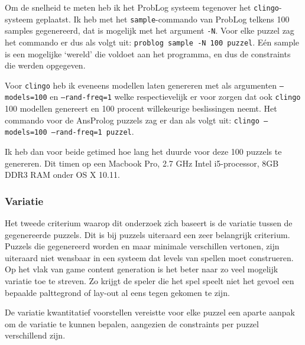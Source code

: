 \documentclass{article}
\begin{document}
Om de snelheid te meten heb ik het ProbLog systeem tegenover het \texttt{clingo}-systeem geplaatst. Ik heb met het \texttt{sample}-commando van ProbLog telkens 100 samples gegenereerd, dat is mogelijk met het argument \texttt{-N}. Voor elke puzzel zag het commando er dus als volgt uit: \texttt{problog sample -N 100 puzzel}. E\'en sample is een mogelijke `wereld' die voldoet aan het programma, en dus de constraints die werden opgegeven.

Voor \texttt{clingo} heb ik eveneens modellen laten genereren met als argumenten \texttt{--models=100} en \texttt{--rand-freq=1} welke respectievelijk er voor zorgen dat ook \texttt{clingo} 100 modellen genereert en 100 procent willekeurige beslissingen neemt. Het commando voor de AnsProlog puzzels zag er dan als volgt uit: \texttt{clingo --models=100 --rand-freq=1 puzzel}.

Ik heb dan voor beide getimed hoe lang het duurde voor deze 100 puzzels te genereren. Dit timen op een Macbook Pro, 2.7 GHz Intel i5-processor, 8GB DDR3 RAM onder OS X 10.11.

\subsubsection*{Variatie}
Het tweede criterium waarop dit onderzoek zich baseert is de variatie tussen de gegenereerde puzzels. Dit is bij puzzels uiteraard een zeer belangrijk criterium. Puzzels die gegenereerd worden en maar minimale verschillen vertonen, zijn uiteraard niet wensbaar in een systeem dat levels van spellen moet construeren. Op het vlak van game content generation is het beter naar zo veel mogelijk variatie toe te streven. Zo krijgt de speler die het spel speelt niet het gevoel een bepaalde palttegrond of lay-out al eens tegen gekomen te zijn.

De variatie kwantitatief voorstellen vereistte voor elke puzzel een aparte aanpak om de variatie te kunnen bepalen, aangezien de constraints per puzzel verschillend zijn.
\end{document}
